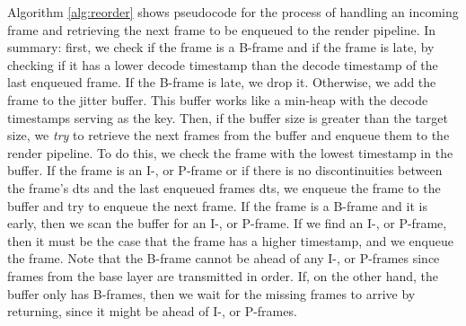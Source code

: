 Algorithm \ref{alg:reorder} shows pseudocode for the process of handling an incoming frame and retrieving the next frame to be enqueued to the render pipeline. In summary: first, we check if the frame is a B-frame and if the frame is late, by checking if it has a lower decode timestamp than the decode timestamp of the last enqueued frame. If the B-frame is late, we drop it. Otherwise, we add the frame to the jitter buffer. This buffer works like a min-heap with the decode timestamps serving as the key. Then, if the buffer size is greater than the target size, we \textit{try} to retrieve the next frames from the buffer and enqueue them to the render pipeline. To do this, we check the frame with the lowest timestamp in the buffer. If the frame is an I-, or P-frame or if there is no discontinuities between the frame's dts and the last enqueued frames dts, we enqueue the frame to the buffer and try to enqueue the next frame. If the frame is a B-frame and it is early, then we scan the buffer for an I-, or P-frame. If we find an I-, or P-frame, then it must be the case that the frame has a higher timestamp, and we enqueue the frame. Note that the B-frame cannot be ahead of any I-, or P-frames since frames from the base layer are transmitted in order. If, on the other hand, the buffer only has B-frames, then we wait for the missing frames to arrive by returning, since it might be ahead of I-, or P-frames.

